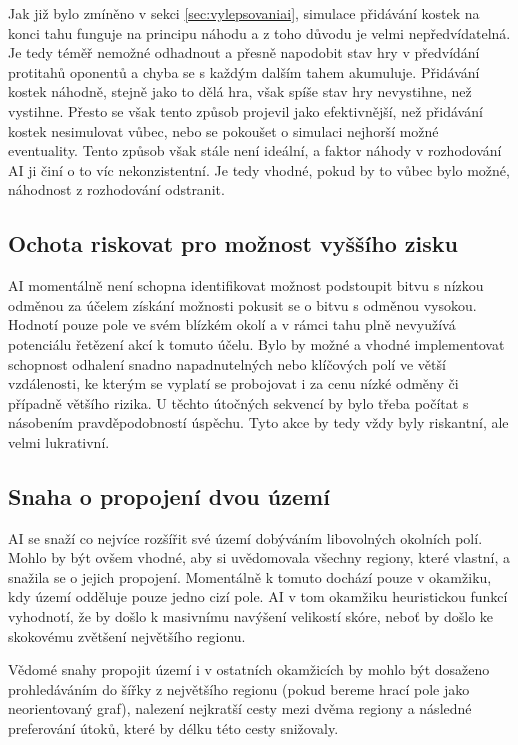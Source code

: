 \documentclass[a4paper]{article}
\begin{document}
Jak již bylo zmíněno v sekci \ref{sec:vylepsovaniai}, simulace přidávání kostek na konci tahu funguje na principu náhodu a z toho důvodu je velmi nepředvídatelná. Je tedy téměř nemožné odhadnout a přesně napodobit stav hry v předvídání protitahů oponentů a chyba se s každým dalším tahem akumuluje. Přidávání kostek náhodně, stejně jako to dělá hra, však spíše stav hry nevystihne, než vystihne. Přesto se však tento způsob projevil jako efektivnější, než přidávání kostek nesimulovat vůbec, nebo se pokoušet o simulaci nejhorší možné eventuality. Tento způsob však stále není ideální, a faktor náhody v rozhodování AI ji činí o to víc nekonzistentní. Je tedy vhodné, pokud by to vůbec bylo možné, náhodnost z rozhodování odstranit.  

\subsection{Ochota riskovat pro možnost vyššího zisku}

AI momentálně není schopna identifikovat možnost podstoupit bitvu s nízkou odměnou za účelem získání možnosti pokusit se o bitvu s odměnou vysokou. Hodnotí pouze pole ve svém blízkém okolí a v rámci tahu plně nevyužívá potenciálu řetězení akcí k tomuto účelu. Bylo by možné a vhodné implementovat schopnost odhalení snadno napadnutelných nebo klíčových polí ve větší vzdálenosti, ke kterým se vyplatí se probojovat i za cenu nízké odměny či případně většího rizika. U těchto útočných sekvencí by bylo třeba počítat s násobením pravděpodobností úspěchu. Tyto akce by tedy vždy byly riskantní, ale velmi lukrativní. 

\subsection{Snaha o propojení dvou území}

AI se snaží co nejvíce rozšířit své území dobýváním libovolných okolních polí. Mohlo by být ovšem vhodné, aby si uvědomovala všechny regiony, které vlastní, a snažila se o jejich propojení. Momentálně k tomuto dochází pouze v okamžiku, kdy území odděluje pouze jedno cizí pole. AI v tom okamžiku heuristickou funkcí vyhodnotí, že by došlo k masivnímu navýšení velikostí skóre, neboť by došlo ke skokovému zvětšení největšího regionu.

Vědomé snahy propojit území i v ostatních okamžicích by mohlo být dosaženo prohledáváním do šířky z největšího regionu (pokud bereme hrací pole jako neorientovaný graf), nalezení nejkratší cesty mezi dvěma regiony a následné preferování útoků, které by délku této cesty snižovaly.
\end{document}
